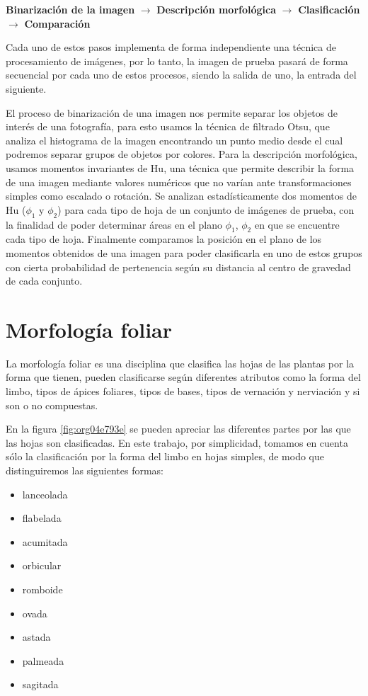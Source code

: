 \documentclass[letter]{article}
\begin{document}
\begin{center}
\textbf{Binarización de la imagen} \(\rightarrow\) \textbf{Descripción morfológica} \(\rightarrow\)
 \textbf{Clasificación} \(\rightarrow\) \textbf{Comparación}
\end{center}

Cada uno de estos pasos implementa de forma independiente una técnica de
procesamiento de imágenes, por lo tanto, la imagen de prueba pasará de forma
secuencial por cada uno de estos procesos, siendo la salida de uno, la entrada
del siguiente.

El proceso de binarización de una imagen nos permite separar los objetos de
interés de una fotografía, para esto usamos la técnica de filtrado Otsu, que
analiza el histograma de la imagen encontrando un punto medio desde el cual
podremos separar grupos de objetos por colores. Para la descripción morfológica,
usamos momentos invariantes de Hu, una técnica que permite describir la forma de
una imagen mediante valores numéricos que no varían ante transformaciones
simples como escalado o rotación. Se analizan estadísticamente dos momentos de
Hu (\(\phi_1\) y \(\phi_2\)) para cada tipo de hoja de un conjunto de imágenes de
prueba, con la finalidad de poder determinar áreas en el plano \(\phi_1\), \(\phi_2\)
en que se encuentre cada tipo de hoja. Finalmente comparamos la posición en el
plano de los momentos obtenidos de una imagen para poder clasificarla en uno de
estos grupos con cierta probabilidad de pertenencia según su distancia al
centro de gravedad de cada conjunto.

\section{Morfología foliar}
\label{sec:org810b8a5}
La morfología foliar es una disciplina que clasifica las hojas de las plantas
por la forma que tienen, pueden clasificarse según diferentes atributos como la
forma del limbo, tipos de ápices foliares, tipos de bases, tipos de vernación y
nerviación y si son o no compuestas.

En la figura \ref{fig:org04e793e} se pueden apreciar las diferentes partes por las que las
hojas son clasificadas. En este trabajo, por simplicidad, tomamos en cuenta sólo
la clasificación por la forma del limbo en hojas simples, de modo que
distinguiremos las siguientes formas:

\begin{itemize}
\item lanceolada
\item flabelada
\item acumitada
\item orbicular
\item romboide
\item ovada
\item astada
\item palmeada
\item sagitada
\end{itemize}
\end{document}
